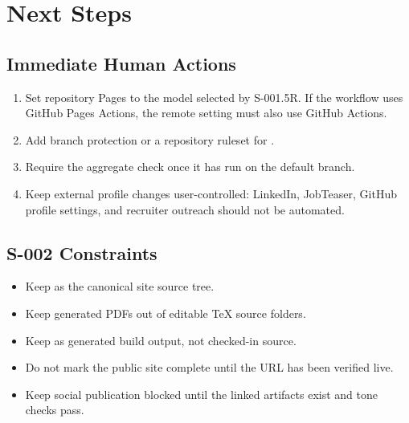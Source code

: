 \documentclass[a4paper,11pt,openany]{report}
\begin{document}
\chapter{Next Steps}
\label{ch:next}


\section{Immediate Human Actions}

\begin{enumerate}
  \item Set repository Pages to the model selected by S-001.5R. If the workflow
    uses GitHub Pages Actions, the remote setting must also use GitHub Actions.
  \item Add branch protection or a repository ruleset for .
  \item Require the aggregate  check once it has run on the
    default branch.
  \item Keep external profile changes user-controlled: LinkedIn, JobTeaser,
    GitHub profile settings, and recruiter outreach should not be automated.
\end{enumerate}

\section{S-002 Constraints}

\begin{itemize}
  \item Keep  as the canonical site source tree.
  \item Keep generated PDFs out of editable TeX source folders.
  \item Keep  as generated build output, not checked-in
    source.
  \item Do not mark the public site complete until the URL has been verified
    live.
  \item Keep social publication blocked until the linked artifacts exist and
    tone checks pass.
\end{itemize}
\end{document}
